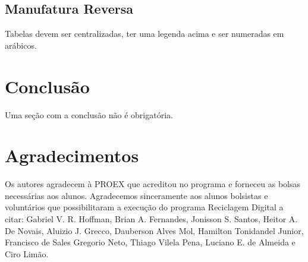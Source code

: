 \documentclass[a4paper]{ifacconf}
\begin{document}
\subsection{Manufatura Reversa}



Tabelas devem ser centralizadas, ter uma legenda acima e ser numeradas em arábicos.


\section{Conclusão}

Uma seção com a conclusão não é obrigatória. 

\section*{Agradecimentos}
Os autores agradecem à PROEX que acreditou no programa e forneceu as bolsas necessárias aos alunos. Agradecemos sinceramente aos alunos bolsistas e voluntários que possibilitaram a execução do programa Reciclagem Digital a citar: Gabriel V. R. Hoffman, Brian A. Fernandes, Jonisson S. Santos, Heitor A. De Novais, Aluizio J. Grecco, Dauberson Alves Mol, Hamilton Tonidandel Junior, Francisco de Sales Gregorio Neto, Thiago Vilela Pena, Luciano E. de Almeida e Ciro Limão.

                                                                  
\end{document}
